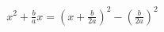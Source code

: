 \documentclass[preview]{standalone}
\begin{document}
\begin{align*}
x^2 + \frac{b}{a}x =(x+ \frac{b}{2a})^2 - (\frac{b}{2a})^2
\end{align*}
\end{document}
